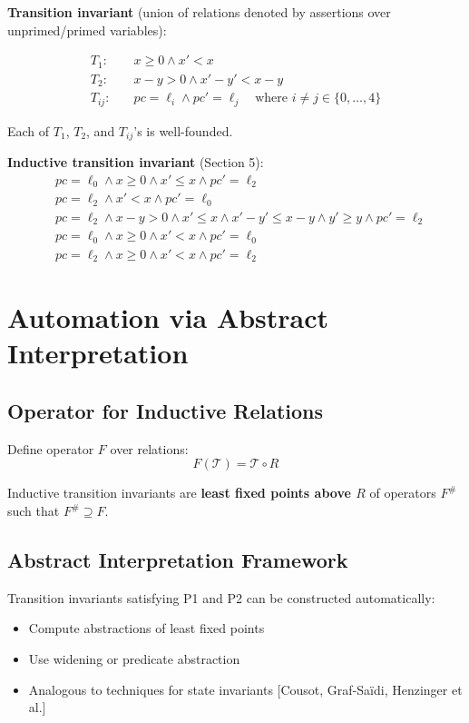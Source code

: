 \documentclass{article}
\begin{document}
\textbf{Transition invariant} (union of relations denoted by assertions over unprimed/primed variables):

\begin{align}
T_1: \quad & x \geq 0 \land x' < x\\
T_2: \quad & x - y > 0 \land x' - y' < x - y\\
T_{ij}: \quad & pc = \ell_i \land pc' = \ell_j \quad \text{where } i \neq j \in \{0, \ldots, 4\}
\end{align}

Each of $T_1$, $T_2$, and $T_{ij}$'s is well-founded.

\textbf{Inductive transition invariant} (Section 5):
\begin{align}
& pc = \ell_0 \land x \geq 0 \land x' \leq x \land pc' = \ell_2\\
& pc = \ell_2 \land x' < x \land pc' = \ell_0\\
& pc = \ell_2 \land x - y > 0 \land x' \leq x \land x' - y' \leq x - y \land y' \geq y \land pc' = \ell_2\\
& pc = \ell_0 \land x \geq 0 \land x' < x \land pc' = \ell_0\\
& pc = \ell_2 \land x \geq 0 \land x' < x \land pc' = \ell_2
\end{align}

\section{Automation via Abstract Interpretation}

\subsection{Operator for Inductive Relations}

Define operator $F$ over relations:
\begin{equation}
F(\mathcal{T}) = \mathcal{T} \circ R
\end{equation}

Inductive transition invariants are \textbf{least fixed points above $R$} of operators $F^{\#}$ such that $F^{\#} \supseteq F$.

\subsection{Abstract Interpretation Framework}

Transition invariants satisfying P1 and P2 can be constructed automatically:
\begin{itemize}
    \item Compute abstractions of least fixed points
    \item Use widening or predicate abstraction
    \item Analogous to techniques for state invariants [Cousot, Graf-Saïdi, Henzinger et al.]
\end{itemize}
\end{document}
